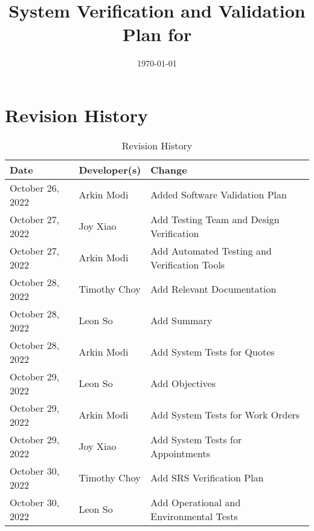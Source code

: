 \documentclass[12pt, titlepage]{article}
\begin{document}
\title{System Verification and Validation Plan for \progname{}}
\author{\authname}
\date{\today}

\maketitle


\section{Revision History}

\begin{longtable}{p{} p{} p{}}
	\caption{Revision History} \label{TblRevisionHistory}                                                 \\
	\toprule
	\textbf{Date}    & \textbf{Developer(s)} & \textbf{Change}                                            \\
	\midrule
	October 26, 2022 & Arkin Modi            & Added Software Validation Plan                             \\
	October 27, 2022 & Joy Xiao              & Add Testing Team and Design Verification                   \\
	October 27, 2022 & Arkin Modi            & Add Automated Testing and Verification Tools               \\
	October 28, 2022 & Timothy Choy          & Add Relevant Documentation                                 \\
	October 28, 2022 & Leon So               & Add Summary                                                \\
	October 28, 2022 & Arkin Modi            & Add System Tests for Quotes                                \\
	October 29, 2022 & Leon So               & Add Objectives                                             \\
	October 29, 2022 & Arkin Modi            & Add System Tests for Work Orders                           \\
	October 29, 2022 & Joy Xiao              & Add System Tests for Appointments                          \\
	October 30, 2022 & Timothy Choy          & Add SRS Verification Plan                                  \\
	October 30, 2022 & Leon So               & Add Operational and Environmental Tests                    \\

\end{longtable}
\end{document}
